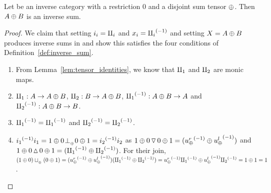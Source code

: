
\begin{lemma}\label{lem:tensor_disjoint_sum_cats_are_inverse_sum_categories}
  Let \X be an inverse category with a restriction 0 and a disjoint sum tensor $\oplus$. Then $A\oplus B$ is
  an inverse sum.
\end{lemma}
\begin{proof}
  We claim that setting $i_i = \amalg_{i}$ and $x_i = {\amalg_{i}}^{(-1)}$ and setting $X = A\oplus B$ produces inverse
  sums in \X and show this satisfies the four conditions of Definition~\ref{def:inverse_sum}.
  \begin{enumerate}[{(}i{)}]
    \item From Lemma~\ref{lem:tensor_identities}, we know that $\amalg_{1}$ and $\amalg_{2}$ are monic maps.
    \item $\amalg_{1} : A \to A\oplus B$, $\amalg_{2}: B \to A\oplus B$, ${\amalg_{1}}^{(-1)}: A\oplus B \to A$ and ${\amalg_{2}}^{(-1)}: A\oplus B \to B$.
    \item ${\amalg_{1}}^{(-1)} = {\amalg_{1}}^{(-1)}$ and ${\amalg_{2}}^{(-1)} = {\amalg_{2}}^{(-1)}$.
    \item ${i_1}^{(-1)}i_1 = 1\oplus 0 {}_{{}_{}}{\perp_{{}_{\oplus}}} 0\oplus1 = {i_2}^{(-1)}i_2$ as
      $1\oplus0 \operatorname{\triangledown} 0\oplus1 = ({u_{\oplus}^r}^{(-1)}\oplus{\ensuremath{u_{\oplus}^l}}^{(-1)})$ and
      $1\oplus0 \operatorname{\vartriangle} 0\oplus1 = ({\amalg_{1}}^{(-1)}\oplus{\amalg_{2}}^{(-1)})$. For their join,
      $(1\oplus0)\sqcup_{{_{\oplus}}} (0\oplus1) = ({u_{\oplus}^r}^{(-1)}\oplus{\ensuremath{u_{\oplus}^l}}^{(-1)})({\amalg_{1}}^{(-1)}\oplus{\amalg_{2}}^{(-1)}) =
      {u_{\oplus}^r}^{(-1)}{\amalg_{1}}^{(-1)} \oplus {\ensuremath{u_{\oplus}^l}}^{(-1)}{\amalg_{2}}^{(-1)} = 1\oplus1 = 1$.
  \end{enumerate}
\end{proof}


